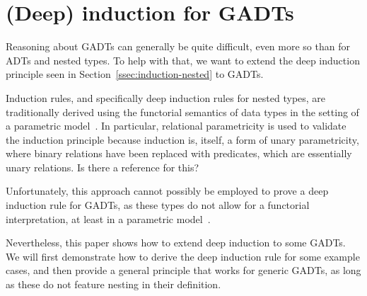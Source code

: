 \documentclass[9pt]{entcs} \usepackage{entcsmacro}
\begin{document}
\section{(Deep) induction for GADTs}



Reasoning about GADTs can generally be quite difficult,
even more so than for ADTs and nested types.
To help with that,
we want to extend the deep induction principle seen in Section~\ref{ssec:induction-nested} to GADTs.

Induction rules, and specifically deep induction rules for nested types,
are traditionally derived using the functorial semantics of data types
in the setting of a parametric model~\cite{jp19}.
In particular, relational parametricity is used to validate the induction principle because induction is, itself,
a form of unary parametricity, where binary relations have been replaced with predicates,
which are essentially unary relations.
{\color{blue} Is there a reference for this?}

Unfortunately, this approach cannot possibly be employed
to prove a deep induction rule for GADTs,
as these types do not allow for a functorial interpretation,
at least in a parametric model~\cite{Haskell-paper}.

Nevertheless, this paper shows how to extend deep induction to some GADTs.
We will first demonstrate how to derive the deep induction rule for some example cases,
and then provide a general principle that works for generic GADTs,
as long as these do not feature nesting in their definition.
\end{document}
